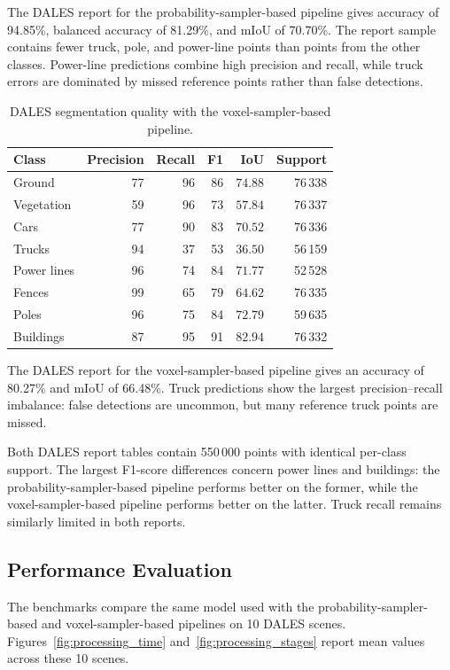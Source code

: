 The DALES report for the probability-sampler-based pipeline gives accuracy of 94.85\%, balanced accuracy of 81.29\%, and mIoU of 70.70\%. The report sample contains fewer truck, pole, and power-line points than points from the other classes. Power-line predictions combine high precision and recall, while truck errors are dominated by missed reference points rather than false detections.

\begin{table}[H]
  \centering
  \caption{DALES segmentation quality with the voxel-sampler-based pipeline.}
  \label{tab:dales_voxel}
  \small
  \begin{tabular}{lrrrrr}
    \toprule
    Class & Precision & Recall & F1 & IoU & Support \\
    \midrule
    Ground & 77 & 96 & 86 & $74.88$ & 76\,338 \\
    Vegetation & 59 & 96 & 73 & $57.84$ & 76\,337 \\
    Cars & 77 & 90 & 83 & $70.52$ & 76\,336 \\
    Trucks & 94 & 37 & 53 & $36.50$ & 56\,159 \\
    Power lines & 96 & 74 & 84 & $71.77$ & 52\,528 \\
    Fences & 99 & 65 & 79 & $64.62$ & 76\,335 \\
    Poles & 96 & 75 & 84 & $72.79$ & 59\,635 \\
    Buildings & 87 & 95 & 91 & $82.94$ & 76\,332 \\
    \bottomrule
  \end{tabular}
\end{table}

The DALES report for the voxel-sampler-based pipeline gives an accuracy of 80.27\% and mIoU of 66.48\%. Truck predictions show the largest precision--recall imbalance: false detections are uncommon, but many reference truck points are missed.

Both DALES report tables contain 550\,000 points with identical per-class support. The largest F1-score differences concern power lines and buildings: the probability-sampler-based pipeline performs better on the former, while the voxel-sampler-based pipeline performs better on the latter. Truck recall remains similarly limited in both reports.

\subsection{Performance Evaluation}

The benchmarks compare the same model used with the probability-sampler-based and voxel-sampler-based pipelines on 10 DALES scenes. Figures~\ref{fig:processing_time} and~\ref{fig:processing_stages} report mean values across these 10 scenes.


